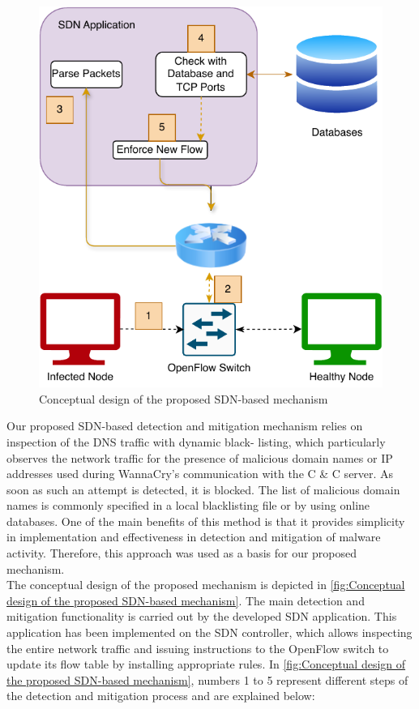 \documentclass[12pt,letterpaper]{article}
\begin{document}
            \begin{figure}[ht]
                \centering
                \includegraphics{images/ConceptDesign.drawio.pdf}
                \caption{Conceptual design of the proposed SDN-based mechanism}
                \label{fig:Conceptual design of the proposed SDN-based mechanism}
            \end{figure}

            Our proposed SDN-based detection and mitigation mechanism relies on inspection of the \ac{DNS} traffic with dynamic black- listing, which particularly observes the network traffic for the presence of malicious domain names or IP addresses used during WannaCry’s communication with the C \& C server. %
            As soon as such an attempt is detected, it is blocked. The list of malicious domain names is commonly specified in a local blacklisting file or by using online databases. One of the main benefits of this method is that it provides simplicity in implementation and effectiveness in detection and mitigation of malware activity. Therefore, this approach was used as a basis for our proposed mechanism.
\\
            The conceptual design of the proposed mechanism is depicted in \autoref{fig:Conceptual design of the proposed SDN-based mechanism}. The main detection and mitigation functionality is carried out by the developed SDN application. This application has been implemented on the SDN controller, which allows inspecting the entire network traffic and issuing instructions to the OpenFlow switch to update its flow table by installing appropriate rules. In \autoref{fig:Conceptual design of the proposed SDN-based mechanism}, numbers 1 to 5 represent different steps of the detection and mitigation process and are explained below:
\end{document}
